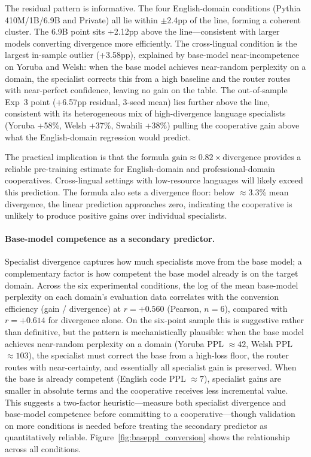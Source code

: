 \documentclass{article}
\begin{document}
The residual pattern is informative. The four English-domain conditions (Pythia 410M/1B/6.9B and Private) all lie within $\pm$2.4pp of the line, forming a coherent cluster. The 6.9B point sits +2.12pp above the line---consistent with larger models converting divergence more efficiently. The cross-lingual condition is the largest in-sample outlier (+3.58pp), explained by base-model near-incompetence on Yoruba and Welsh: when the base model achieves near-random perplexity on a domain, the specialist corrects this from a high baseline and the router routes with near-perfect confidence, leaving no gain on the table. The out-of-sample Exp~3 point (+6.57pp residual, 3-seed mean) lies further above the line, consistent with its heterogeneous mix of high-divergence language specialists (Yoruba +58\%, Welsh +37\%, Swahili +38\%) pulling the cooperative gain above what the English-domain regression would predict.

The practical implication is that the formula $\text{gain} \approx 0.82 \times \text{divergence}$ provides a reliable pre-training estimate for English-domain and professional-domain cooperatives. Cross-lingual settings with low-resource languages will likely exceed this prediction. The formula also sets a divergence floor: below $\approx$3.3\% mean divergence, the linear prediction approaches zero, indicating the cooperative is unlikely to produce positive gains over individual specialists.

\paragraph{Base-model competence as a secondary predictor.}
Specialist divergence captures how much specialists move from the base model; a complementary factor is how competent the base model already is on the target domain. Across the six experimental conditions, the log of the mean base-model perplexity on each domain's evaluation data correlates with the conversion efficiency (gain / divergence) at $r = +0.560$ (Pearson, $n = 6$), compared with $r = +0.614$ for divergence alone. On the six-point sample this is suggestive rather than definitive, but the pattern is mechanistically plausible: when the base model achieves near-random perplexity on a domain (Yoruba PPL $\approx 42$, Welsh PPL $\approx 103$), the specialist must correct the base from a high-loss floor, the router routes with near-certainty, and essentially all specialist gain is preserved. When the base is already competent (English code PPL $\approx 7$), specialist gains are smaller in absolute terms and the cooperative receives less incremental value. This suggests a two-factor heuristic---measure both specialist divergence and base-model competence before committing to a cooperative---though validation on more conditions is needed before treating the secondary predictor as quantitatively reliable. Figure~\ref{fig:baseppl_conversion} shows the relationship across all conditions.
\end{document}
